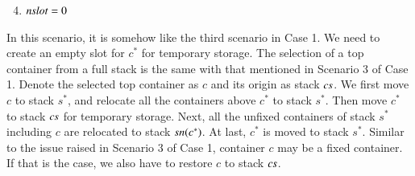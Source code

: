 \documentclass[review,3p,times,authoryear,12pt]{elsarticle}
\begin{document}
\begin{enumerate}
\setcounter{enumi}{3}
\item $\id{nslot}=0$
\end{enumerate}
In this scenario, it is somehow like the third scenario in Case 1. We need to create an empty slot for $c^*$ for temporary storage. The selection of a top container from a full stack is the same with that mentioned in Scenario 3 of Case 1. Denote the selected top container as $c$ and its origin as stack $\id{cs}$. We first move $c$ to stack $s^*$, and relocate all the containers above $c^*$ to stack $s^*$. Then move $c^*$ to stack $\id{cs}$ for temporary storage. Next, all the unfixed containers of stack $s^*$ including $c$ are relocated to stack $\id{sn}(c^*)$. At last, $c^*$ is moved to stack $s^*$. Similar to the issue raised in Scenario 3 of Case 1, container $c$ may be a fixed container. If that is the case, we also have to restore $c$ to stack $\id{cs}$.
\end{document}
